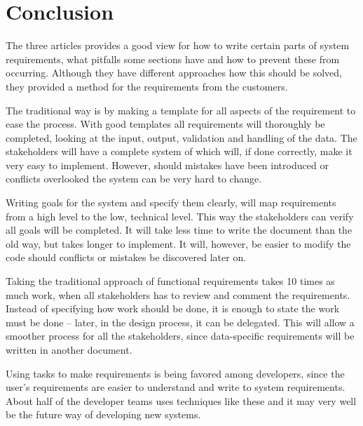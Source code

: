 \documentclass[Main]{subfiles}
\begin{document}
\section{Conclusion}
The three articles provides a good view for how to write certain parts of system requirements, what pitfalls some sections have and how to prevent these from occurring.
Although they have different approaches how this should be solved, they provided a method for the requirements from the customers.

The traditional way is by making a template for all aspects of the requirement to ease the process. 
With good templates all requirements will thoroughly be completed, looking at the input, output, validation and handling of the data.
The stakeholders will have a complete system of which will, if done correctly, make it very easy to implement.
However, should mistakes have been introduced or conflicts overlooked the system can be very hard to change.


Writing goals for the system and specify them clearly, will map requirements from a high level to the low, technical level. 
This way the stakeholders can verify all goals will be completed.
It will take less time to write the document than the old way, but takes longer to implement.
It will, however, be easier to modify the code should conflicts or mistakes be discovered later on.

Taking the traditional approach of functional requirements takes 10 times as much work, when all stakeholders has to review and comment the requirements. 
Instead of specifying how work should be done, it is enough to state the work must be done -- later, in the design process, it can be delegated.
This will  allow a smoother process for all the stakeholders, since data-specific requirements will be written in another document.

Using tasks to make requirements is being favored among developers, since the user's requirements are easier to understand and write to system requirements.
About half of the developer teams uses techniques like these and it may very well be the future way of developing new systems.
\end{document}
